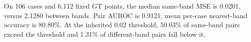 On 106 cases and 6,112 fixed GT points, the median same-band MSE is 0.0201, versus 2.1280 between bands. Pair AUROC is 0.9121; mean per-case nearest-band accuracy is 80.80\%. At the inherited 0.02 threshold, 50.03\% of same-band pairs exceed the threshold and 1.31\% of different-band pairs fall below it.
